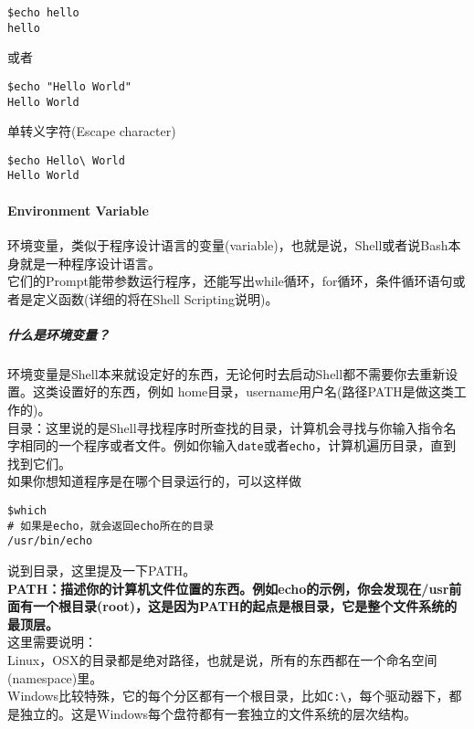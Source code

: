 \documentclass[
]{article}
\begin{document}
\begin{verbatim}
$echo hello
hello
\end{verbatim}

或者

\begin{verbatim}
$echo "Hello World"
Hello World
\end{verbatim}

单转义字符(Escape character)

\begin{verbatim}
$echo Hello\ World
Hello World
\end{verbatim}

\hypertarget{environment-variable}{%
\paragraph{Environment Variable}\label{environment-variable}}

环境变量，类似于程序设计语言的变量(variable)，也就是说，Shell或者说Bash本身就是一种程序设计语言。\\
它们的Prompt能带参数运行程序，还能写出while循环，for循环，条件循环语句或者是定义函数(详细的将在Shell
Scripting说明)。

\hypertarget{ux4ec0ux4e48ux662fux73afux5883ux53d8ux91cf}{%
\subparagraph{什么是环境变量？}\label{ux4ec0ux4e48ux662fux73afux5883ux53d8ux91cf}}

环境变量是Shell本来就设定好的东西，无论何时去启动Shell都不需要你去重新设置。这类设置好的东西，例如
home目录，username用户名(路径PATH是做这类工作的)。\\
目录：这里说的是Shell寻找程序时所查找的目录，计算机会寻找与你输入指令名字相同的一个程序或者文件。例如你输入\texttt{date}或者\texttt{echo}，计算机遍历目录，直到找到它们。\\
如果你想知道程序是在哪个目录运行的，可以这样做

\begin{verbatim}
$which
# 如果是echo，就会返回echo所在的目录
/usr/bin/echo
\end{verbatim}

说到目录，这里提及一下PATH。\\
\textbf{PATH：描述你的计算机文件位置的东西。例如echo的示例，你会发现在/usr前面有一个根目录(root)，这是因为PATH的起点是根目录，它是整个文件系统的最顶层。}\\
这里需要说明：\\
Linux，OSX的目录都是绝对路径，也就是说，所有的东西都在一个命名空间(namespace)里。\\
Windows比较特殊，它的每个分区都有一个根目录，比如\texttt{C:\textbackslash{}}，每个驱动器下，都是独立的。这是Windows每个盘符都有一套独立的文件系统的层次结构。
\end{document}
